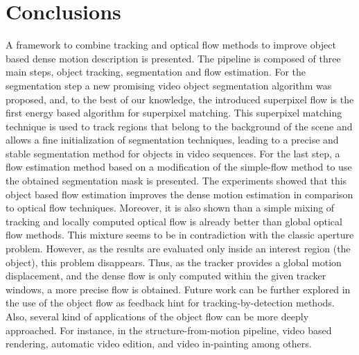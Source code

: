 \chapter{Conclusions} \label{chap:conclusion}

A framework to combine tracking and optical flow methods to improve 
object based dense motion description is presented. The pipeline is 
composed of three main steps, object tracking, segmentation and 
flow estimation. For the segmentation step a new promising video object 
segmentation algorithm was proposed, and, to the best of our knowledge, 
the introduced superpixel flow is the first energy based algorithm for superpixel matching.
This superpixel matching technique is used to track regions that belong to the background of the 
scene and allows a fine initialization of segmentation techniques, leading to a precise and stable 
segmentation method for objects in video sequences.
For the last step, a flow estimation method based on a modification of the simple-flow method to use 
the obtained segmentation mask is presented. The experiments showed that this object based flow estimation improves the dense motion 
estimation in comparison to optical flow techniques. Moreover, it is also shown than a simple 
mixing of tracking and locally computed optical flow is already better than global optical flow methods. 
This mixture seems to be in contradiction with the classic aperture problem. However, as the results are evaluated only inside an interest region (the object), this problem disappears. Thus, as the tracker provides 
a global motion displacement, and the dense flow is only computed within the given tracker windows, a 
more precise flow is obtained.
Future work can be further explored in the use of the object flow as feedback hint for tracking-by-detection methods. Also, 
several kind of applications of the object flow can be more deeply approached. For instance, 
in the structure-from-motion pipeline, video based rendering, automatic video edition, and video in-painting  among others.



